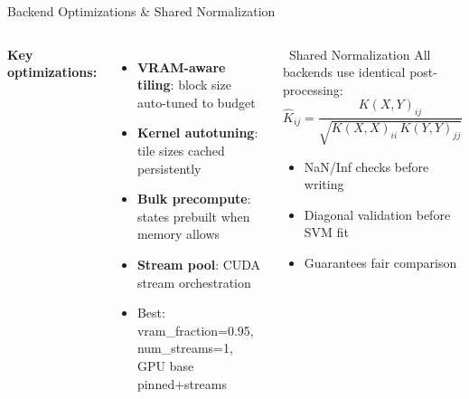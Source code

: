 \documentclass[10pt, aspectratio=169]{beamer}
\begin{document}
\begin{frame}{Backend Optimizations \& Shared Normalization}
    \begin{columns}[T,onlytextwidth]
        \textbf{Key optimizations:}
        \begin{itemize}
            \item \textbf{VRAM-aware tiling}: block size auto-tuned to budget
            \item \textbf{Kernel autotuning}: tile sizes cached persistently
            \item \textbf{Bulk precompute}: states prebuilt when memory allows
            \item \textbf{Stream pool}: CUDA stream orchestration
            \item Best: vram\_fraction=0.95, num\_streams=1, GPU base pinned+streams
        \end{itemize}
        \begin{block}{\faBalanceScale\ Shared Normalization}
            All backends use identical post-processing:
            \[\hat{K}_{ij} = \frac{K(X,Y)_{ij}}{\sqrt{K(X,X)_{ii}\,K(Y,Y)_{jj}}}\]
            \begin{itemize}
                \item NaN/Inf checks before writing
                \item Diagonal validation before SVM fit
                \item Guarantees fair comparison
            \end{itemize}
        \end{block}
    \end{columns}
\end{frame}
\end{document}
